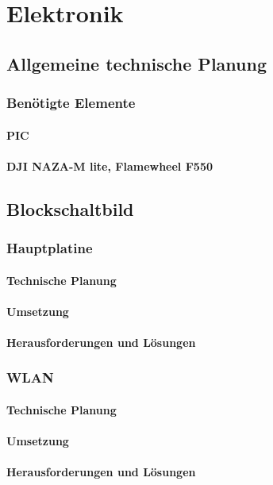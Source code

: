 \chapter{Elektronik}
\renewcommand{\kapitelautor}{Autor: Lucas Ullrich}

\section{Allgemeine technische Planung}

  \subsection{Benötigte Elemente}

    \subsubsection{PIC}

    \subsubsection{DJI NAZA-M lite, Flamewheel F550}

\section{Blockschaltbild}

  \subsection{Hauptplatine}

    \subsubsection{Technische Planung}

    \subsubsection{Umsetzung}

    \subsubsection{Herausforderungen und Lösungen}

  \subsection{WLAN}

    \subsubsection{Technische Planung}

    \subsubsection{Umsetzung}

    \subsubsection{Herausforderungen und Lösungen}
